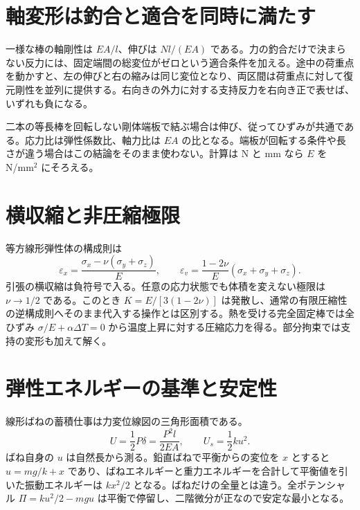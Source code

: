\section{軸変形は釣合と適合を同時に満たす}
\label{theory:analysis:fixedbar}
\label{theory:analysis:compositebar}
\label{theory:analysis:parallelbar}
\label{theory:analysis:extension}
一様な棒の軸剛性は \(EA/l\)、伸びは \(Nl/(EA)\) である。力の釣合だけで決まらない反力には、固定端間の総変位がゼロという適合条件を加える。途中の荷重点を動かすと、左の伸びと右の縮みは同じ変位となり、両区間は荷重点に対して復元剛性を並列に提供する。右向きの外力に対する支持反力を右向き正で表せば、いずれも負になる。

二本の等長棒を回転しない剛体端板で結ぶ場合は伸び、従ってひずみが共通である。応力比は弾性係数比、軸力比は \(EA\) の比となる。端板が回転する条件や長さが違う場合はこの結論をそのまま使わない。計算は N と mm なら \(E\) を N/mm\(^2\) にそろえる。\cite{mit_material_elastic2000}

\section{横収縮と非圧縮極限}
\label{theory:analysis:hooke}
\label{theory:analysis:incompressible}
\label{theory:analysis:thermal}
等方線形弾性体の構成則は
\[
 \varepsilon_x=\frac{\sigma_x-\nu(\sigma_y+\sigma_z)}{E},\qquad
 \varepsilon_v=\frac{1-2\nu}{E}(\sigma_x+\sigma_y+\sigma_z).
\]
引張の横収縮は負符号で入る。任意の応力状態でも体積を変えない極限は \(\nu\to1/2\) である。このとき \(K=E/[3(1-2\nu)]\) は発散し、通常の有限圧縮性の逆構成則へそのまま代入する操作とは区別する。熱を受ける完全固定棒では全ひずみ \(\sigma/E+\alpha\Delta T=0\) から温度上昇に対する圧縮応力を得る。部分拘束では支持の変形も加えて解く。\cite{mit_material_elastic2000}

\section{弾性エネルギーの基準と安定性}
\label{theory:analysis:axialenergy}
\label{theory:analysis:potential}
\label{theory:analysis:verticalenergy}
線形ばねの蓄積仕事は力変位線図の三角形面積である。
\[
 U=\frac12 P\delta=\frac{P^2l}{2EA},\qquad
 U_s=\frac12ku^2.
\]
ばね自身の \(u\) は自然長から測る。鉛直ばねで平衡からの変位を \(x\) とすると \(u=mg/k+x\) であり、ばねエネルギーと重力エネルギーを合計して平衡値を引いた振動エネルギーは \(kx^2/2\) となる。ばねだけの全量とは違う。全ポテンシャル \(\Pi=ku^2/2-mgu\) は平衡で停留し、二階微分が正なので安定な最小となる。\cite{analysis57_shm}

